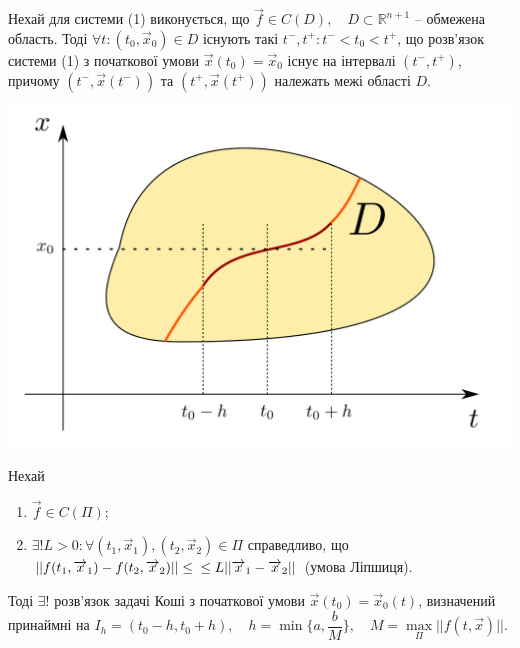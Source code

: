 \documentclass[14pt,a4paper]{scrartcl}
\theoremstyle{definition}
\theoremstyle{definition}
\theoremstyle{definition}
\begin{document}
\begin{boxteo}
Нехай для системи (1) виконується, що $\overrightarrow{f} \in C(D), \quad D \subset \mathbb{R}^{n + 1}$ -- обмежена область. Тоді $\forall t : (t_0, \overrightarrow{x}_0) \in D$ існують такі $t^{-}, t^{+} : t^{-} < t_0 < t^{+}$, що розв'язок системи (1) з початкової умови $\overrightarrow{x}(t_0) = \overrightarrow{x}_0$ існує на інтервалі $(t^{-}, t^{+})$, причому $(t^{-}, \overrightarrow{x}(t^{-})) \text{ та } (t^{+}, \overrightarrow{x}(t^{+}))$ належать межі області $D$.
    \begin{center} \includegraphics[scale=0.35]{assets/lect0.png} \end{center}
\end{boxteo}

\begin{boxteo}
  Нехай
  \begin{spacing}{1}
  \begin{enumerate}
    \item $\overrightarrow{f} \in C(\Pi)$;
    \item $\exists! L > 0 : \forall (t_1, \overrightarrow{x}_1), (t_2, \overrightarrow{x}_2) \in \Pi$ справедливо, що $|| f(t_1, \overrightarrow{x}_1) - f(t_2, \overrightarrow{x}_2)|| \leq \\ \leq L||\overrightarrow{x}_1 - \overrightarrow{x}_2||$ (умова Ліпшиця).
  \end{enumerate}
  \end{spacing}


  Тоді $\exists!$ розв'язок задачі Коші з початкової умови $\overrightarrow{x}(t_0) = \overrightarrow{x}_0(t)$, визначений принаймні на $I_h = (t_0 - h, t_0 + h), \quad h = \min\{{a, \dfrac{b}{M}}\}, \quad M = \max\limits_{\Pi}||f(t, \overrightarrow{x})||$.
\end{boxteo}
\end{document}
